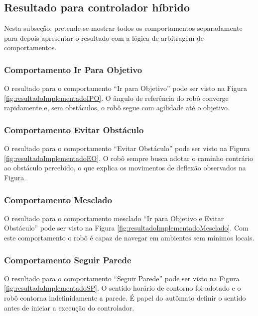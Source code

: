 	\subsection{Resultado para controlador híbrido}
	
	Nesta subseção, pretende-se mostrar todos os comportamentos separadamente para 
	depois apresentar o resultado com a lógica de arbitragem de comportamentos.
	
	\subsubsection{Comportamento Ir Para Objetivo}
	
	O resultado para o comportamento ``Ir para Objetivo'' pode ser visto na Figura
	\ref{fig:resultadoImplementadoIPO}. O ângulo de referência do robô converge rapidamente
	e, sem obstáculos, o robô segue com agilidade até o objetivo.
	
	
	
	\subsubsection{Comportamento Evitar Obstáculo}
	
	O resultado para o comportamento ``Evitar Obstáculo'' pode ser visto na Figura	
	\ref{fig:resultadoImplementadoEO}. O robô sempre busca adotar o caminho contrário
	ao obstáculo percebido, o que explica os movimentos de deflexão observados na Figura.
	
	
	
	\subsubsection{Comportamento Mesclado}
	
	O resultado para o comportamento mesclado ``Ir para Objetivo e Evitar Obstáculo'' pode 
	ser visto na Figura \ref{fig:resultadoImplementadoMesclado}. Com este comportamento
	o robô é capaz de navegar em ambientes sem mínimos locais.   
	
	
	
	\subsubsection{Comportamento Seguir Parede}
	
	O resultado para o comportamento ``Seguir Parede'' pode ser visto na Figura
	\ref{fig:resultadoImplementadoSP}. O sentido horário de contorno foi adotado
	e o robô contorna indefinidamente a parede. É papel do autômato definir o sentido 
	antes de iniciar a execução do controlador.
	
